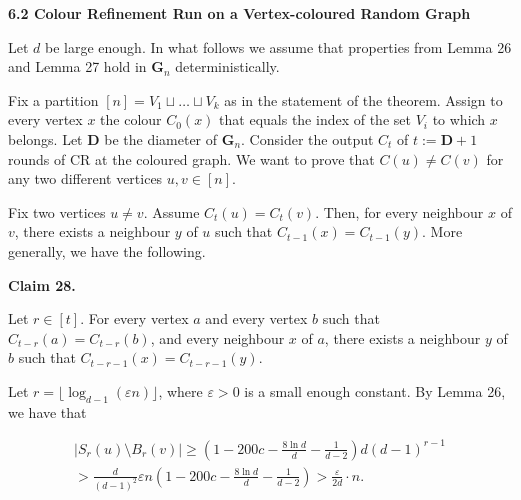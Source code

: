\documentclass[10pt,a4paper]{article}
\begin{document}
\par\medskip\noindent\textbf{
6.2 Colour Refinement Run on a Vertex-coloured Random Graph}\par




Let $d$ be large enough. In what follows we assume that properties from Lemma 26 and Lemma 27 hold in $\mathbf{G}_{n}$ deterministically.\par




Fix a partition $[n]=V_{1}\sqcup\ldots\sqcup V_{k}$ as in the statement of the theorem. Assign to every vertex $x$ the colour $C_{0}(x)$ that equals the index of the set $V_{i}$ to which $x$ belongs. Let $\mathbf{D}$ be the diameter of $\mathbf{G}_{n}$. Consider the output $C_{t}$ of $t:=\mathbf{D}+1$ rounds of CR at the coloured graph. We want to prove that $C(u)\neq C(v)$ for any two different vertices $u,v\in[n]$.\par




Fix two vertices $u\neq v$. Assume $C_{t}(u)=C_{t}(v)$. Then, for every neighbour $x$ of $v$, there exists a neighbour $y$ of $u$ such that $C_{t-1}(x)=C_{t-1}(y)$. More generally, we have the following.\par





\par\medskip\noindent\textbf{
Claim 28. 
}\par



Let $r\in[t]$. For every vertex $a$ and every vertex $b$ such that $C_{t-r}(a)=C_{t-r}(b)$, and every neighbour $x$ of $a$, there exists a neighbour $y$ of $b$ such that $C_{t-r-1}(x)=C_{t-r-1}(y)$.\par






Let $r=\lfloor\log_{d-1}(\varepsilon n)\rfloor$, where $\varepsilon>0$ is a small enough constant. By Lemma 26, we have that\par


\[\begin{gathered}
\displaystyle|S_{r}(u)\setminus B_{r}(v)| \displaystyle\geq\left(1-200c-\frac{8\ln d}{d}-\frac{1}{d-2}\right)d(d-1)^{r-1} \\
\displaystyle>\frac{d}{(d-1)^{2}}\varepsilon n\left(1-200c-\frac{8\ln d}{d}-\frac{1}{d-2}\right)>\frac{\varepsilon}{2d}\cdot n.
\end{gathered}\]
\end{document}
